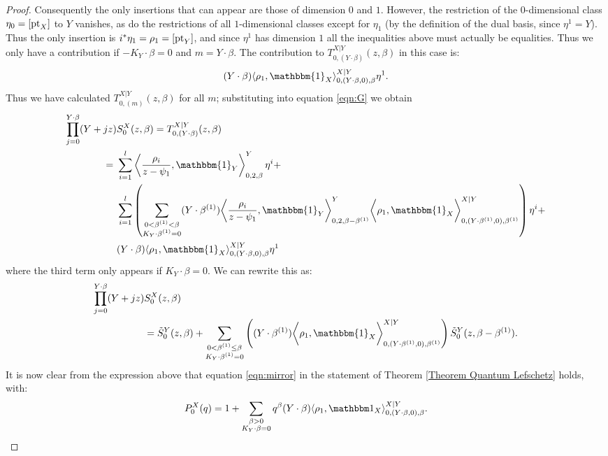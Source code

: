 \begin{proof}
Consequently the only insertions that can appear are those of dimension $0$ and $1$. However, the restriction of the $0$-dimensional class $\eta_0 = [\operatorname{pt}_X]$ to $Y$ vanishes, as do the restrictions of all $1$-dimensional classes except for $\eta_1$ (by the definition of the dual basis, since $\eta^1 = Y$). Thus the only insertion is $i^*\eta_1=\rho_1=[\operatorname{pt}_Y]$, and since $\eta^1$ has dimension $1$ all the inequalities above must actually be equalities. Thus we only have a contribution if $-K_Y \cdot \beta = 0$ and $m = Y \cdot \beta$. The contribution to $T_{0,(Y\cdot\beta)}^{X|Y}(z,\beta)$ in this case is:
\begin{equation*} (Y \cdot \beta) \langle \rho_1 , \mathbbm{1}_X \rangle_{0,(Y \cdot \beta,0),\beta}^{X|Y} \eta^1. \end{equation*}
Thus we have calculated $T_{0,(m)}^{X|Y}(z,\beta)$ for all $m$; substituting into equation \eqref{eqn:G} we obtain
\begin{align*} \prod_{j=0}^{Y \cdot \beta} (Y + jz) & S_0^X(z,\beta) = T_{0,(Y\cdot\beta)}^{X|Y}(z,\beta) \\
= \ & \sum_{i=1}^l \left\langle \dfrac{\rho_i}{z-\psi_1}, \mathbbm{1}_Y \right\rangle_{0,2,\beta}^Y \eta^i + \\
& \sum_{i=1}^l \left( \sum_{\substack{0 < \beta^{(1)} < \beta \\ K_Y \cdot \beta^{(1)}=0}} (Y \cdot \beta^{(1)}) \bigg\langle \dfrac{\rho_i}{z-\psi_1}, \mathbbm{1}_Y \bigg\rangle_{0,2,\beta-\beta^{(1)}}^Y \bigg\langle \rho_1, \mathbbm{1}_X \bigg\rangle_{0,(Y \cdot \beta^{(1)},0),\beta^{(1)}}^{X|Y} \right) \eta^i + \\
& (Y \cdot \beta) \langle \rho_1 , \mathbbm{1}_X \rangle_{0,(Y \cdot \beta,0),\beta}^{X|Y} \eta^1
\end{align*}
where the third term only appears if $K_Y \cdot \beta=0$. We can rewrite this as:
\begin{align*} \prod_{j=0}^{Y \cdot \beta} (Y + jz) & S_0^X(z,\beta) \\
& = \tilde{S}_0^Y(z,\beta) + \sum_{\substack{0 < \beta^{(1)} \leq \beta \\ K_Y \cdot \beta^{(1)}=0}} \left( (Y \cdot \beta^{(1)}) \bigg\langle \rho_1, \mathbbm{1}_X \bigg\rangle_{0,(Y \cdot \beta^{(1)},0),\beta^{(1)}}^{X|Y} \right) \tilde{S}_0^Y(z,\beta-\beta^{(1)}).
\end{align*}
It is now clear from the expression above that equation \eqref{eqn:mirror} in the statement of Theorem \ref{Theorem Quantum Lefschetz} holds, with:
\begin{equation*} P_0^X(q) = 1 + \sum_{\substack{\beta>0 \\ K_Y\cdot\beta=0}} q^\beta (Y\cdot\beta) \langle \rho_1,\mathbbm 1_{X}\rangle_{0,(Y\cdot\beta,0),\beta}^{X|Y}. \end{equation*}

\end{proof}
